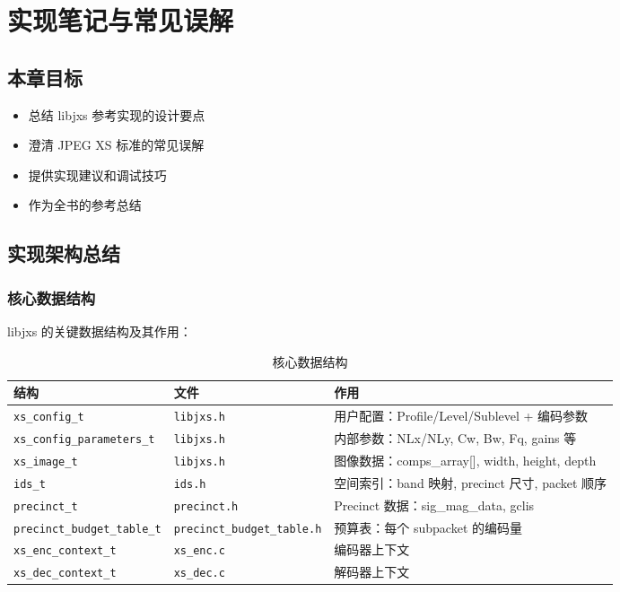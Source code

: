 
\chapter{实现笔记与常见误解}\label{ch:notes}

\section{本章目标}

\begin{itemize}
  \item 总结 libjxs 参考实现的设计要点
  \item 澄清 JPEG XS 标准的常见误解
  \item 提供实现建议和调试技巧
  \item 作为全书的参考总结
\end{itemize}

\section{实现架构总结}

\subsection{核心数据结构}

libjxs 的关键数据结构及其作用：

\begin{table}[H]
\centering
\caption{核心数据结构}
\begin{tabular}{@{}lll@{}}
\toprule
结构 & 文件 & 作用 \\
\midrule
\texttt{xs\_config\_t} & \texttt{libjxs.h} & 用户配置：Profile/Level/Sublevel + 编码参数 \\
\texttt{xs\_config\_parameters\_t} & \texttt{libjxs.h} & 内部参数：NLx/NLy, Cw, Bw, Fq, gains 等 \\
\texttt{xs\_image\_t} & \texttt{libjxs.h} & 图像数据：comps\_array[], width, height, depth \\
\texttt{ids\_t} & \texttt{ids.h} & 空间索引：band 映射, precinct 尺寸, packet 顺序 \\
\texttt{precinct\_t} & \texttt{precinct.h} & Precinct 数据：sig\_mag\_data, gclis \\
\texttt{precinct\_budget\_table\_t} & \texttt{precinct\_budget\_table.h} & 预算表：每个 subpacket 的编码量 \\
\texttt{xs\_enc\_context\_t} & \texttt{xs\_enc.c} & 编码器上下文 \\
\texttt{xs\_dec\_context\_t} & \texttt{xs\_dec.c} & 解码器上下文 \\
\bottomrule
\end{tabular}
\end{table}

